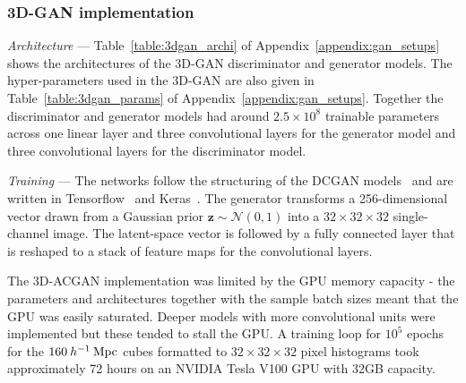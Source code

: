 \documentclass[twocolumn]{article}
\numberwithin{equation}{section}
\begin{document}


\subsubsection{3D-GAN implementation} %
\textit{Architecture} --- 
Table~\ref{table:3dgan_archi} of Appendix~\ref{appendix:gan_setups} shows the architectures of the 3D-GAN discriminator and generator models. The hyper-parameters used in the 3D-GAN are also given in Table~\ref{table:3dgan_params} of Appendix~\ref{appendix:gan_setups}. Together the discriminator and generator models had around $2.5\times10^8$ trainable parameters across one linear layer and three convolutional layers for the generator model and three convolutional layers for the discriminator model. \\

{\setlength{\parindent}{0cm}
\textit{Training} --- 
The networks follow the structuring of the DCGAN models~\cite{dcgan} and are written in Tensorflow~\cite{tensorflow} and Keras~\cite{keras}. The generator transforms a 256-dimensional vector drawn from a Gaussian prior $\mathbf{z}\sim \mathcal{N} (0,1)$ into a $32 \times 32 \times 32$ single-channel image. The latent-space vector is followed by a fully connected layer that is reshaped to a stack of feature maps for the convolutional layers. 

The 3D-ACGAN implementation was limited by the GPU memory capacity - the parameters and architectures together with the sample batch sizes meant that the GPU was easily saturated. Deeper models with more convolutional units were implemented but these tended to stall the GPU. A training loop for $10^5$ epochs for the $160 \: h^{-1}\: \textup{Mpc}$ cubes formatted to $32 \times 32 \times 32$ pixel histograms took approximately 72 hours on an NVIDIA Tesla V100 GPU with 32GB capacity. 
}
\end{document}
